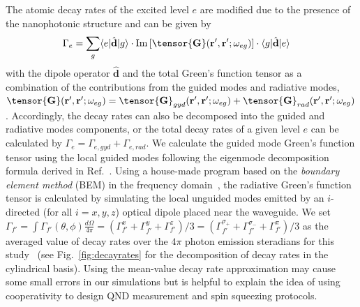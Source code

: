 \documentclass[preprint,aps,pra,onecolumn,superscriptaddress]{revtex4-1} %
\def\br{\mathbf{r}}
\def\bra#1{\langle{#1}\rvert}%
\def\ket#1{\lvert{#1}\rangle}%
\begin{document}
\begin{appendix}
The atomic decay rates of the excited level $ e $ are modified due to the presence of the nanophotonic structure and can be given by
\begin{align}
\Gamma_e &= \sum_g \bra{e}\hat{\mathbf{d}}\ket{g} \cdot \mathrm{Im}\left[\tensor{\mathbf{G}}(\br',\br';\omega_{eg}) \right]\cdot \bra{g}\hat{\mathbf{d}}\ket{e}
\end{align}
with the dipole operator $ \hat{\mathbf{d}} $ and the total Green's function tensor as a combination of the contributions from the guided modes and radiative modes, $ \tensor{\mathbf{G}}(\br',\br';\omega_{eg})=\tensor{\mathbf{G}}_{gyd}(\br',\br';\omega_{eg})+\tensor{\mathbf{G}}_{rad}(\br',\br';\omega_{eg}) $.
Accordingly, the decay rates can also be decomposed into the guided and radiative modes components, or the total decay rates of a given level $ e $ can be calculated by $ \Gamma_e=\Gamma_{e,gyd}+\Gamma_{e,rad} $.
We calculate the guided mode Green's function tensor using the local guided modes following the eigenmode decomposition formula derived in Ref.~\cite{Qi2016}. Using a house-made program based on the \textit{boundary element method} (BEM) in the frequency domain~\cite{Abajo2002,GarciadeAbajo1998Relativistic}, the radiative Green's function tensor is calculated by simulating the local unguided modes emitted by an $i$-directed (for all $ i=x,y,z $) optical dipole placed near the waveguide. We set $ \Gamma_{f'}= \int \Gamma_{f'}(\theta,\phi)\frac{d\Omega}{4\pi}=(\Gamma_{f'}^x+\Gamma_{f'}^y+\Gamma_{f'}^z)/3=(\Gamma_{f'}^{\sigma_+}+\Gamma_{f'}^{\sigma_-}+\Gamma_{f'}^\pi)/3$ as the averaged value of decay rates over the $4\pi$ photon emission steradians for this study~\cite{Novotny2012} (see Fig.~\ref{fig:decayrates} for the decomposition of decay rates in the cylindrical basis). Using the mean-value decay rate approximation may cause some small errors in our simulations but is helpful to explain the idea of using cooperativity to design QND measurement and spin squeezing protocols. 


\end{appendix}
\end{document}

